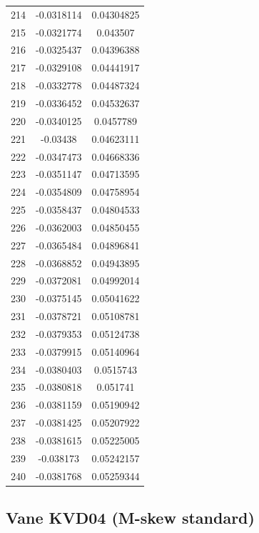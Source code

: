 \documentclass[a4paper, 11pt, oneside]{report}
\begin{document}
{\begin{longtable}{|c|c|c|}
214 & -0.0318114 & 0.04304825 \\
215 & -0.0321774 & 0.043507   \\
216 & -0.0325437 & 0.04396388 \\
217 & -0.0329108 & 0.04441917 \\
218 & -0.0332778 & 0.04487324 \\
219 & -0.0336452 & 0.04532637 \\
220 & -0.0340125 & 0.0457789  \\
221 & -0.03438   & 0.04623111 \\
222 & -0.0347473 & 0.04668336 \\
223 & -0.0351147 & 0.04713595 \\
224 & -0.0354809 & 0.04758954 \\
225 & -0.0358437 & 0.04804533 \\
226 & -0.0362003 & 0.04850455 \\
227 & -0.0365484 & 0.04896841 \\
228 & -0.0368852 & 0.04943895 \\
229 & -0.0372081 & 0.04992014 \\
230 & -0.0375145 & 0.05041622 \\
231 & -0.0378721 & 0.05108781 \\
232 & -0.0379353 & 0.05124738 \\
233 & -0.0379915 & 0.05140964 \\
234 & -0.0380403 & 0.0515743  \\
235 & -0.0380818 & 0.051741   \\
236 & -0.0381159 & 0.05190942 \\
237 & -0.0381425 & 0.05207922 \\
238 & -0.0381615 & 0.05225005 \\
239 & -0.038173  & 0.05242157 \\
240 & -0.0381768 & 0.05259344 \\
\hline
\end{longtable}
\unskip
\unpenalty
\unpenalty}

\begin{multicols}{2}
\unvbox\ltmcbox
\end{multicols}

\subsection{Vane KVD04 (M-skew standard)}
\end{document}
